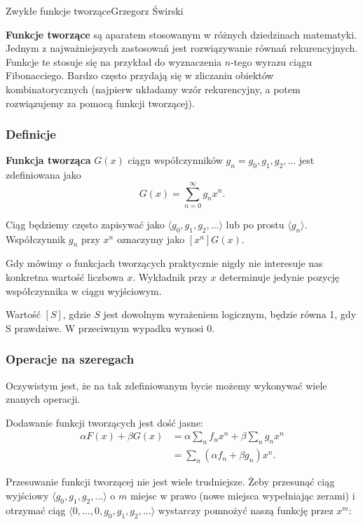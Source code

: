 \begin{referat}{Zwykłe funkcje tworzące}{Grzegorz Świrski}

\begin{teoria}

\textbf{Funkcje tworzące} są aparatem stosowanym w różnych
dziedzinach matematyki. Jednym z najważniejszych zastosowań
jest rozwiązywanie równań rekurencyjnych. Funkcje te stosuje się
na przykład do wyznaczenia $n$-tego wyrazu ciągu Fibonacciego.
Bardzo często przydają się w zliczaniu obiektów kombinatorycznych
(najpierw układamy wzór rekurencyjny, a potem rozwiązujemy za pomocą
funkcji tworzącej).

\subsubsection{Definicje}

\textbf{Funkcja tworząca} $G(x)$ ciągu współczynników 
${g_n} = g_0, g_1, g_2,...$ jest zdefiniowana jako 
$$ G(x) = \sum^{\infty}_{n=0} g_n x^n.$$

Ciąg będziemy często zapisywać jako $\langle g_0, g_1, g_2, ... \rangle$
lub po prostu $\langle g_n \rangle$. Współczynnik $g_n$ przy $x^n$
oznaczymy jako $[x^n]G(x)$.

Gdy mówimy o funkcjach tworzących praktycznie nigdy nie interesuje
nas konkretna wartość liczbowa $x$. Wykładnik przy $x$ determinuje
jedynie pozycję współczynnika w ciągu wyjściowym.

Wartość $[S]$, gdzie $S$ jest dowolnym wyrażeniem logicznym, będzie równa
1, gdy S prawdziwe. W przeciwnym wypadku wynosi 0.

\subsubsection{Operacje na szeregach}

Oczywistym jest, że na tak zdefiniowanym bycie możemy wykonywać wiele
znanych operacji.

Dodawanie funkcji tworzących jest dość jasne:
\begin{align*} 
  \alpha F(x) + \beta G(x) &= \alpha \sum_n f_n x^n + \beta \sum_n g_n x^n \\
                           &= \sum_n (\alpha f_n + \beta g_n)x^n.
\end{align*}

Przesuwanie funkcji tworzącej nie jest wiele trudniejsze.
Żeby przesunąć ciąg wyjściowy $\langle g_0, g_1, g_2,... \rangle$
o $m$ miejsc w prawo (nowe miejsca wypełniając zerami) i otrzymać
ciąg $\langle 0,...,0,g_0,g_1,g_2,...\rangle$ wystarczy pomnożyć
naszą funkcję przez $x^m$:


\end{teoria}
\end{referat}
